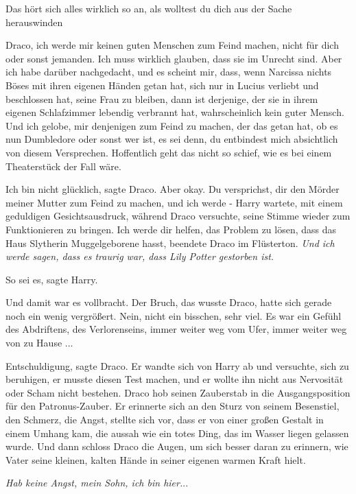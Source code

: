 \glqq{}Das hört sich alles wirklich so an, als wolltest du dich aus der Sache
herauswinden\grqq{}

\glqq{}Draco, ich werde mir keinen guten Menschen zum Feind machen, nicht für
dich oder sonst jemanden. Ich muss wirklich glauben, dass sie im Unrecht sind.
Aber ich habe darüber nachgedacht, und es scheint mir, dass, wenn Narcissa
nichts Böses mit ihren eigenen Händen getan hat, sich nur in Lucius verliebt und
beschlossen hat, seine Frau zu bleiben, dann ist derjenige, der sie in ihrem
eigenen Schlafzimmer lebendig verbrannt hat, wahrscheinlich kein guter Mensch.
Und ich gelobe, mir denjenigen zum Feind zu machen, der das getan hat, ob es nun
Dumbledore oder sonst wer ist, es sei denn, du entbindest mich absichtlich von
diesem Versprechen. Hoffentlich geht das nicht so schief, wie es bei einem
Theaterstück der Fall wäre.\grqq{}

\glqq{}Ich bin nicht glücklich\grqq{}, sagte Draco. \glqq{}Aber okay. Du
versprichst, dir den Mörder meiner Mutter zum Feind zu machen, und ich werde
-\grqq{} Harry wartete, mit einem geduldigen Gesichtsausdruck, während Draco
versuchte, seine Stimme wieder zum Funktionieren zu bringen. \glqq{}Ich werde dir
helfen, das Problem zu lösen, dass das Haus Slytherin Muggelgeborene
hasst\grqq{}, beendete Draco im Flüsterton. \glqq{}\emph{Und ich werde sagen,
dass es traurig war, dass Lily Potter gestorben ist.}\grqq{}

\glqq{}So sei es\grqq{}, sagte Harry.

Und damit war es vollbracht. Der Bruch, das wusste Draco, hatte sich gerade noch
ein wenig vergrößert. Nein, nicht ein bisschen, sehr viel. Es war ein Gefühl des
Abdriftens, des Verlorenseins, immer weiter weg vom Ufer, immer weiter weg von
zu Hause ...

\glqq{}Entschuldigung\grqq{}, sagte Draco. Er wandte sich von Harry ab und
versuchte, sich zu beruhigen, er musste diesen Test machen, und er wollte ihn
nicht aus Nervosität oder Scham nicht bestehen. Draco hob seinen Zauberstab in
die Ausgangsposition für den Patronus-Zauber. Er erinnerte sich an den Sturz von
seinem Besenstiel, den Schmerz, die Angst, stellte sich vor, dass er von einer
großen Gestalt in einem Umhang kam, die aussah wie ein totes Ding, das im Wasser
liegen gelassen wurde. Und dann schloss Draco die Augen, um sich besser daran zu
erinnern, wie Vater seine kleinen, kalten Hände in seiner eigenen warmen Kraft
hielt.

\emph{Hab keine Angst, mein Sohn, ich bin hier.}..

